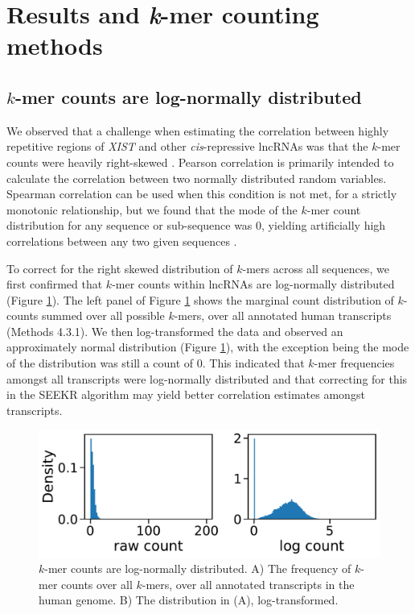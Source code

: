 \section{Results and \textit{k}-mer counting methods} 

\subsection{$k$-mer counts are log-normally distributed}

We observed that a challenge when estimating the correlation between highly repetitive regions of \emph{XIST} and other \emph{cis}-repressive lncRNAs was that the $k$-mer counts were heavily right-skewed \cite{Sprague2019NonlinearDomains}. Pearson correlation is primarily intended to calculate the correlation between two normally distributed random variables. Spearman correlation can be used when this condition is not met, for a strictly monotonic relationship, but we found that the mode of the $k$-mer count distribution for any sequence or sub-sequence was 0, yielding artificially high correlations between any two given sequences \cite{Sprague2019NonlinearDomains}. 

To correct for the right skewed distribution of $k$-mers across all sequences, we first confirmed that $k$-mer counts within lncRNAs are log-normally distributed (Figure \ref{fig:logdist}). The left panel of Figure \ref{fig:logdist} shows the marginal count distribution of $k$-counts summed over all possible $k$-mers, over all annotated human transcripts (Methods 4.3.1). We then log-transformed the data and observed an approximately normal distribution (Figure \ref{fig:logdist}), with the exception being the mode of the distribution was still a count of 0. This indicated that $k$-mer frequencies amongst all transcripts were log-normally distributed and that correcting for this in the SEEKR algorithm may yield better correlation estimates amongst transcripts. 
\begin{figure}[h!]
\centering
\includegraphics[width=.8\textwidth]{images/kmers_log_dist.pdf}
\caption[$k$-mers are log-normally distributed within sequences]{$k$-mer counts are log-normally distributed. A) The frequency of $k$-mer counts over all $k$-mers, over all annotated transcripts in the human genome. B) The distribution in (A), log-transformed.}
\label{fig:logdist}
\end{figure}

